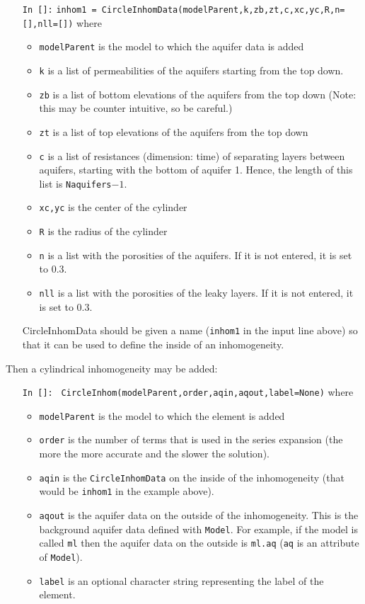\documentclass [10pt,letterpaper] {article}
\begin{document}
\begin{itemize}
\item[{\tt In []:}] {\tt inhom1 = CircleInhomData(modelParent,k,zb,zt,c,xc,yc,R,n=[],nll=[])} where
    \begin{itemize}
    \item {\tt modelParent} is the model to which the aquifer data is
    added
    \item {\tt k} is a list of permeabilities of the aquifers starting
    from the top down.
    \item {\tt zb} is a list of bottom elevations of the aquifers
    from the top down (Note: this may be counter intuitive, so be
    careful.)
    \item {\tt zt} is a list of top elevations of the aquifers
    from the top down
    \item {\tt c} is a list of resistances (dimension: time) of separating layers
    between aquifers, starting with the bottom of aquifer 1. Hence, the
    length of this list is {\tt Naquifers}$-1$.
    \item {\tt xc,yc} is the center of the cylinder
    \item {\tt R} is the radius of the cylinder
    \item {\tt n} is a list with the porosities of the aquifers. If it is not entered, it is set to 0.3.
    \item {\tt nll} is a list with the porosities of the leaky layers. If it is not entered, it is set to 0.3.
    \end{itemize}
    CircleInhomData should be given a name ({\tt inhom1} in the input line above) so that it can be used to
    define the inside of an inhomogeneity.

\end{itemize}
Then a cylindrical inhomogeneity may be added:
\begin{itemize}
\item[{\tt In []:}] {\tt
CircleInhom(modelParent,order,aqin,aqout,label=None)} where
    \begin{itemize}
    \item {\tt modelParent} is the model to which the element is
    added
    \item {\tt order} is the number of terms that is used in the
    series expansion (the more the more accurate and the slower the solution).
    \item {\tt aqin} is the {\tt CircleInhomData} on the inside of the
    inhomogeneity (that would be {\tt inhom1} in the example
    above).
    \item {\tt aqout} is the aquifer data on the outside of the
    inhomogeneity. This is the background aquifer data defined
    with {\tt Model}. For example, if the model is called {\tt ml}
    then the aquifer data on the outside is {\tt ml.aq} ({\tt aq}
    is an attribute of {\tt Model}).
    \item {\tt label} is an optional character string representing the label of the element.
    \end{itemize}
\end{itemize}
\end{document}
